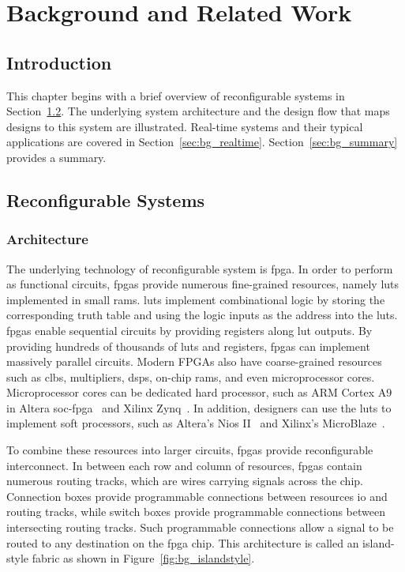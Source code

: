 
\chapter{Background and Related Work}

\label{ch:background}

\section{Introduction}

This chapter begins with a brief overview of reconfigurable systems in Section~\ref{sec:bg_reconfig}.
The underlying system architecture and the design flow that maps designs to this system are illustrated.
Real-time systems and their typical applications are covered in Section~\ref{sec:bg_realtime}.
Section~\ref{sec:bg_summary} provides a summary.

\section{Reconfigurable Systems}
\label{sec:bg_reconfig}

\subsection{Architecture}

The underlying technology of reconfigurable system is \gls{fpga}.
In order to perform as functional circuits, \glspl{fpga} provide numerous fine-grained resources, namely \glspl{lut} implemented in small \glspl{ram}.
\glspl{lut} implement combinational logic by storing the corresponding truth table and using the logic inputs as the address into the \glspl{lut}.
\glspl{fpga} enable sequential circuits by providing registers along \gls{lut} outputs.
By providing hundreds of thousands of \glspl{lut} and registers, \glspl{fpga} can implement massively parallel circuits.
Modern FPGAs also have coarse-grained resources such as \glspl{clb}, multipliers, \glspl{dsp}, on-chip \glspl{ram}, and even microprocessor cores.
Microprocessor cores can be dedicated hard processor, such as ARM Cortex A9 in Altera \gls{soc}-\gls{fpga}~\cite{alterasoc} and Xilinx Zynq~\cite{xilinxzynq}.
In addition, designers can use the \glspl{lut} to implement soft processors, such as Altera's Nios II~\cite{alteranios2} and Xilinx's MicroBlaze~\cite{xilinxmicroblaze}.

To combine these resources into larger circuits, \glspl{fpga} provide reconfigurable interconnect.
In between each row and column of resources, \glspl{fpga} contain numerous routing tracks, which are wires carrying signals across the chip.
Connection boxes provide programmable connections between resources \gls{io} and routing tracks, while switch boxes provide programmable connections between intersecting routing tracks.
Such programmable connections allow a signal to be routed to any destination on the \gls{fpga} chip.
This architecture is called an island-style fabric as shown in Figure~\ref{fig:bg_islandstyle}.

